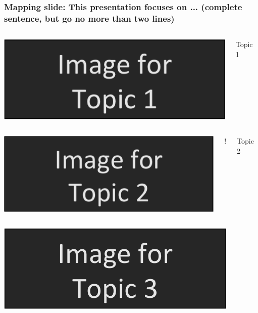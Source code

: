 \documentclass{beamer}
\begin{document}
\begin{frame}
\frametitle{Mapping slide: This presentation focuses on ... (complete sentence, but go no more than two lines)}


\begin{columns}
\centerline{\includegraphics[width=0.9\linewidth]{fig-talk/topic1.png}}



\centerline{Topic 1}



\end{columns}
\begin{columns}

\centerline{\includegraphics[width=0.9\linewidth]{fig-talk/topic2.png}}


!
\centerline{Topic 2}


\end{columns}
\begin{columns}


\centerline{\includegraphics[width=0.9\linewidth]{fig-talk/topic3.png}}




\end{columns}
\end{frame}
\end{document}
